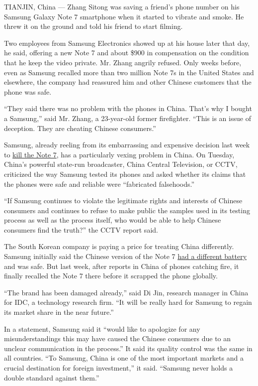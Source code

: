 TIANJIN, China --- Zhang Sitong was saving a friend's phone number on
his Samsung Galaxy Note 7 smartphone when it started to vibrate and
smoke. He threw it on the ground and told his friend to start filming.

Two employees from Samsung Electronics showed up at his house later that
day, he said, offering a new Note 7 and about \$900 in compensation on
the condition that he keep the video private. Mr. Zhang angrily refused.
Only weeks before, even as Samsung recalled more than two million Note
7s in the United States and elsewhere, the company had reassured him and
other Chinese customers that the phone was safe.

``They said there was no problem with the phones in China. That's why I
bought a Samsung,'' said Mr. Zhang, a 23-year-old former firefighter.
``This is an issue of deception. They are cheating Chinese consumers.''

Samsung, already reeling from its embarrassing and expensive decision
last week to
\href{http://www.nytimes.com/2016/10/12/business/international/samsung-galaxy-note7-terminated.html}{kill
the Note 7}, has a particularly vexing problem in China. On Tuesday,
China's powerful state-run broadcaster, China Central Television, or
CCTV, criticized the way Samsung tested its phones and asked whether its
claims that the phones were safe and reliable were ``fabricated
falsehoods.''

``If Samsung continues to violate the legitimate rights and interests of
Chinese consumers and continues to refuse to make public the samples
used in its testing process as well as the process itself, who would be
able to help Chinese consumers find the truth?'' the CCTV report said.

The South Korean company is paying a price for treating China
differently. Samsung initially said the Chinese version of the Note 7
\href{http://www.nytimes.com/2016/09/03/business/samsung-galaxy-note-battery.html}{had
a different battery} and was safe. But last week, after reports in China
of phones catching fire, it finally recalled the Note 7 there before it
scrapped the phone globally.

``The brand has been damaged already,'' said Di Jin, research manager in
China for IDC, a technology research firm. ``It will be really hard for
Samsung to regain its market share in the near future.''

In a statement, Samsung said it ``would like to apologize for any
misunderstandings this may have caused the Chinese consumers due to an
unclear communication in the process.'' It said its quality control was
the same in all countries. ``To Samsung, China is one of the most
important markets and a crucial destination for foreign investment,'' it
said. ``Samsung never holds a double standard against them.''

